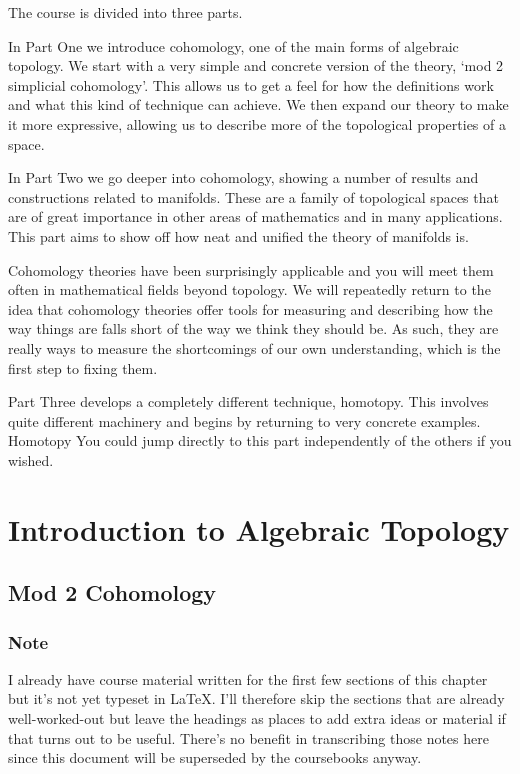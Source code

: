\documentclass[oneside,english]{amsbook}
\numberwithin{section}{chapter}
\theoremstyle{plain}
\theoremstyle{definition}
\begin{document}
	The course is divided into three parts.
	
	In Part One we introduce cohomology, one of the main forms of algebraic topology. We start with a very simple and concrete version of the theory, `mod 2 simplicial cohomology'. This allows us to get a feel for how the definitions work and what this kind of technique can achieve. We then expand our theory to make it more expressive, allowing us to describe more of the topological properties of a space.
	
	In Part Two we go deeper into cohomology, showing a number of results and constructions related to manifolds. These are a family of topological spaces that are of great importance in other areas of mathematics and in many applications. This part aims to show off how neat and unified the theory of manifolds is.
	
	Cohomology theories have been surprisingly applicable and you will meet them often in mathematical fields beyond topology. We will repeatedly return to the idea that cohomology theories offer tools for measuring and describing how the way things are falls short of the way we think they should be. As such, they are really ways to measure the shortcomings of our own understanding, which is the first step to fixing them. 

	Part Three develops a completely different technique, homotopy. This involves quite different machinery and begins by returning to very concrete examples. Homotopy You could jump directly to this part independently of the others if you wished. 
	
	\part{Introduction to Algebraic Topology}
	
	\chapter{Mod 2 Cohomology}

	\section*{Note}

	I already have course material written for the first few sections of this chapter but it's not yet typeset in \LaTeX. I'll therefore skip the sections that are already well-worked-out but leave the headings as places to add extra ideas or material if that turns out to be useful. There's no benefit in transcribing those notes here since this document will be superseded by the coursebooks anyway. 
\end{document}
